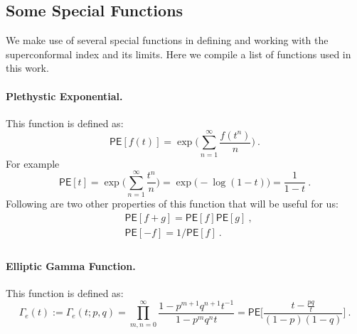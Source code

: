 \documentclass[a4paper,10pt]{article}
\newcommand{\mr}[1]{\mathsf{#1}}
\begin{document}
\begin{appendix}
\section{Some Special Functions}\label{app:special_func}
We make use of several special functions in defining and working with the superconformal index and its limits. Here we compile a list of functions used in this work. 
\paragraph{Plethystic Exponential.} This function is defined as:
\begin{equation}
    \mr{PE}[f(t)]=\exp\bigg(\sum_{n=1}^{\infty}\frac{f(t^n)}{n}\bigg)~.
\end{equation}
For example
\begin{equation}
    \mr{PE}[t]=\exp\bigg(\sum_{n=1}^{\infty}\frac{t^n}{n}\bigg)=\exp\bigg(-\log(1-t)\bigg)=\frac{1}{1-t}~.
\end{equation}
Following are two other properties of this function that will be useful for us:
\begin{equation}
    \begin{split}
        &\mr{PE}[f + g]=\mr{PE}[f]\mr{PE}[g]~, \\
        &\mr{PE}[-f]=1/\mr{PE}[f]~. \\
    \end{split}
\end{equation}
\paragraph{Elliptic Gamma Function.} This function is defined as:
\begin{equation}
    \Gamma_e(t):=\Gamma_e(t;p,q)=\prod_{m,n=0}^{\infty}\frac{1-p^{m+1}q^{n+1}t^{-1}}{1-p^mq^nt}=\mr{PE}\bigg[\frac{t-
    \frac{pq}{t}}{(1-p)(1-q)}\bigg]~.
\end{equation}

\end{appendix}
\end{document}
